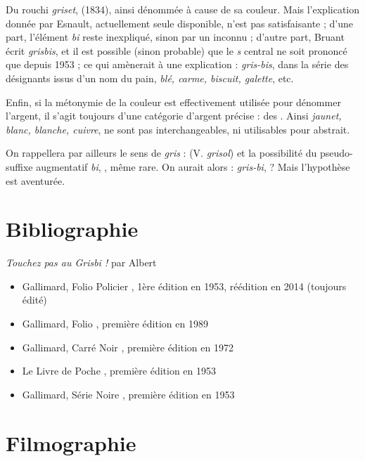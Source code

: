Du rouchi \emph{griset},  (1834), ainsi dénommée à cause de sa couleur. Mais l'explication donnée par Esnault, actuellement seule 
disponible, n'est pas satisfaisante ; d'une part, l'élément \emph{bi} reste
inexpliqué, sinon par un  inconnu ; d'autre part, Bruant écrit
\emph{grisbis}, et il est possible (sinon probable) que le \emph{s} central ne
soit prononcé que depuis 1953 ; ce qui amènerait à une explication :
\emph{gris-bis}, dans la série des désignants issus d'un nom du pain,
\emph{blé, carme, biscuit, galette}, etc.

Enfin, si la métonymie de la couleur est effectivement utilisée pour dénommer
l'argent, il s'agit toujours d'une catégorie d'argent précise : des .
Ainsi \emph{jaunet, blanc, blanche, cuivre}, ne sont pas interchangeables, ni 
utilisables pour  abstrait.

On rappellera par ailleurs le sens de \emph{gris} :  (V. \emph{grisol}) et la possibilité du pseudo-suffixe augmentatif \emph{bi}, , même rare. On aurait alors : \emph{gris-bi},  ? Mais l'hypothèse est aventurée.


\section{Bibliographie\label{preamble-biblio}}


\emph{Touchez pas au Grisbi !} par Albert 

\begin{itemize}
	\item Gallimard, Folio Policier , 1ère édition en 1953, réédition en 2014 (toujours édité)
	\item Gallimard, Folio , première édition en 1989
	\item Gallimard, Carré Noir , première édition en 1972
	\item Le Livre de Poche , première édition en 1953
	\item Gallimard, Série Noire , première édition en 1953
\end{itemize}


\section{Filmographie\label{preamble-filmography}}



